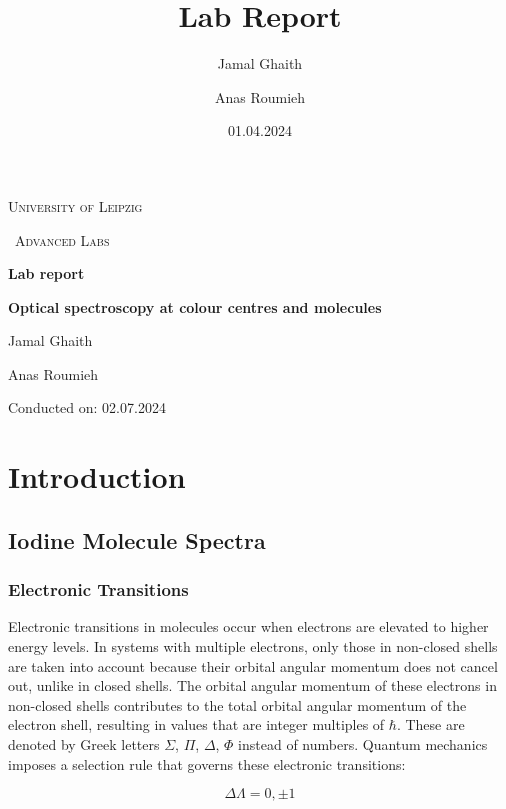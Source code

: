 \documentclass{article}
\title{Lab Report}
\author{Jamal Ghaith}
\author{Anas Roumieh}
\date{01.04.2024}
\begin{document}
\begin{titlepage}
	\centering
	{\scshape\LARGE University of Leipzig \par}
	\vspace{1cm}
	{\scshape\ Advanced Labs\par}
	\vspace{1.5cm}
	{\huge\bfseries Lab report\par}
	\vspace{2cm}
	{\huge\bfseries Optical spectroscopy at colour centres and molecules\par}
	\vspace{2cm}
	{\Large Jamal Ghaith\par}
    {\Large Anas Roumieh\par}
	\vfill

    {\Large Conducted on: 02.07.2024 \par}
	\vfill
\end{titlepage}


\tableofcontents
{}
\pagebreak{}

\section{Introduction}

\subsection{Iodine Molecule Spectra}
\subsubsection{Electronic Transitions}

Electronic transitions in molecules occur when electrons are elevated to higher energy levels. In systems with multiple electrons, only those in non-closed shells are taken into account because their orbital angular momentum does not cancel out, unlike in closed shells. 
The orbital angular momentum of these electrons in non-closed shells contributes to the total orbital angular momentum of the electron shell, resulting in values that are integer multiples of $\hbar$. These are denoted by Greek letters $\Sigma$, $\Pi$, $\Delta$, $\Phi$ instead of numbers. Quantum mechanics imposes a selection rule that governs these electronic transitions:

\begin{equation*}
	\Delta \Lambda = 0, \pm 1
\end{equation*}
\end{document}
